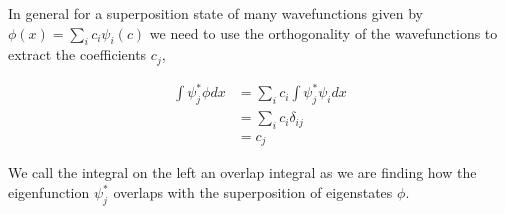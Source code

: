 \documentclass[11pt]{amsart}
\begin{document}
In general for a superposition state of many wavefunctions given by $\phi(x) = \sum\limits_i c_i \psi_i(c)$ we need to use the orthogonality of the wavefunctions to extract the coefficients $c_j$,

\begin{align*}
  \int\psi_j^*\phi dx &= \sum\limits_i c_i \int \psi_j^* \psi_i dx \\
                      &= \sum\limits_i c_i \delta_{ij} \\
                      &= c_j
\end{align*}

We call the integral on the left an overlap integral as we are finding how the eigenfunction $\psi_j^*$ overlaps with the superposition of eigenstates $\phi$.
\end{document}
